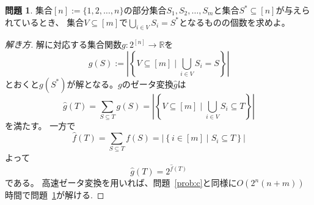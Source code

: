 \documentclass[a4paper,twoside,onecolumn,openany,article,10pt]{memoir}
\theoremstyle{definition}
\newtheorem{problem}{問題}
\theoremstyle{remark}
\begin{document}
\begin{problem}\label{prob:s}
集合$[n]:=\{1,2,\dotsc,n\}$の部分集合$S_1,S_2,\dotsc,S_m$と集合$S^*\subseteq[n]$が与えられているとき、
集合$V\subseteq [m]$で$\bigcup_{i\in V} S_{i}=S^*$となるものの個数を求めよ。
\end{problem}
\begin{proof}[解き方]
解に対応する集合関数$g\colon 2^{[n]}\to\mathbb{R}$を
\begin{equation*}
g(S) := \left|\left\{V\subseteq[m] \mid \bigcup_{i\in V} S_{i}=S\right\}\right|
\end{equation*}
とおくと$g(S^*)$が解となる。$g$のゼータ変換$\widehat{g}$は
\begin{equation*}
\widehat{g}(T) = \sum_{S\subseteq T}g(S) =
\left|\left\{V\subseteq[m] \mid \bigcup_{i\in V} S_{i}\subseteq T\right\}\right|
\end{equation*}
を満たす。
一方で
\begin{equation*}
\widehat{f}(T) = \sum_{S\subseteq T}f(S) =
\left|\left\{i\in[m] \mid S_i\subseteq T\right\}\right|
\end{equation*}
よって
\begin{equation*}
\widehat{g}(T) = 2^{\widehat{f}(T)}
\end{equation*}
である。
高速ゼータ変換を用いれば、問題~\ref{prob:c}と同様に$O(2^n(n+m))$時間で問題~\ref{prob:s}が解ける.
\end{proof}
\end{document}
